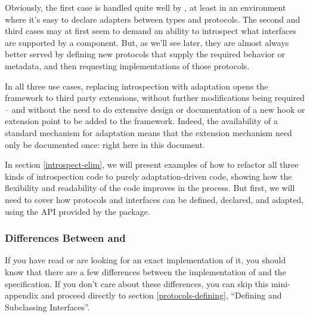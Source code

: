 Obviously, the first case is handled quite well by , at
least in an environment where it's easy to declare adapters between types and
protocols.  The second and third cases may at first seem to demand an ability
to introspect what interfaces are supported by a component.  But, as we'll
see later, they are almost always better served by defining new protocols
that supply the required behavior or metadata, and then requesting
implementations of those protocols.

In all three use cases, replacing introspection with adaptation opens the
framework to third party extensions, without further modifications being
required -- and without the need to do extensive design or documentation
of a new hook or extension point to be added to the framework.  Indeed,
the availability of a standard mechanism for adaptation means that the
extension mechanism need only be documented once: right here in this
document.


In section \ref{introspect-elim}, we will present examples of how to
refactor all three kinds of introspection code to purely adaptation-driven
code, showing how the flexibility and readability of the code improves in the
process.  But first, we will need to cover how protocols and interfaces can
be defined, declared, and adapted, using the API provided by the
 package.

\begin{seealso}


\end{seealso}





















\subsubsection{Differences Between  and }

If you have read  or are looking for an exact implementation of it,
you should know that there are a few differences between the 
implementation of  and the  specification.  If you
don't care about these differences, you can skip this mini-appendix and
proceed directly to section \ref{protocols-defining}, ``Defining and Subclassing
Interfaces''.

